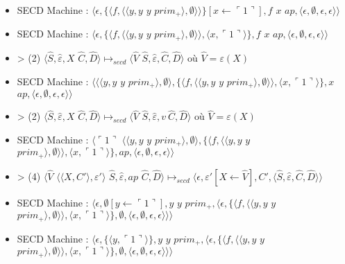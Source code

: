 \documentclass[10pt,a4paper]{article}
\begin{document}
\begin{itemize}
					\item[] SECD Machine : $\langle\epsilon,\{\langle f,\langle\langle y,y$ $y$ $prim_{+}\rangle,\emptyset\rangle\rangle\}[x \leftarrow \ulcorner 1\urcorner],f$ $x$ $ap,\langle\epsilon,\emptyset,\epsilon,\epsilon\rangle\rangle$
					\item[] SECD Machine : $\langle\epsilon,\{\langle f,\langle\langle y,y$ $y$ $prim_{+}\rangle,\emptyset\rangle\rangle,\langle x,\ulcorner 1\urcorner\rangle\},f$ $x$ $ap,\langle\epsilon,\emptyset,\epsilon,\epsilon\rangle\rangle$
					\item[] > (2) $\langle\widehat{S},\widehat{\varepsilon},X$ $\widehat{C},\widehat{D}\rangle \longmapsto_{secd} \langle \widehat{V}$ $\widehat{S},\widehat{\varepsilon},\widehat{C},\widehat{D}\rangle$ où $\widehat{V} = \varepsilon(X)$
					\item[] SECD Machine : $\langle\langle\langle y,y$ $y$ $prim_{+}\rangle,\emptyset\rangle,\{\langle f,\langle\langle y,y$ $y$ $prim_{+}\rangle,\emptyset\rangle\rangle,\langle x,\ulcorner 1\urcorner\rangle\},x$ $ap,\langle\epsilon,\emptyset,\epsilon,\epsilon\rangle\rangle$
					\item[] > (2) $\langle\widehat{S},\widehat{\varepsilon},X$ $\widehat{C},\widehat{D}\rangle \longmapsto_{secd} \langle \widehat{V}$ $\widehat{S},\widehat{\varepsilon},v~
					\widehat{C},\widehat{D}\rangle$ où $\widehat{V} = \varepsilon(X)$
					\item[] SECD Machine : $\langle\ulcorner 1\urcorner$ $\langle\langle y,y$ $y$ $prim_{+}\rangle,\emptyset\rangle,\{\langle f,\langle\langle y,y$ $y$ $prim_{+}\rangle,\emptyset\rangle\rangle,\langle x,\ulcorner 1\urcorner\rangle\},ap,\langle\epsilon,\emptyset,\epsilon,\epsilon\rangle\rangle$
					\item[] > (4) $\langle\widehat{V}$ $\langle\langle X,C'\rangle,\varepsilon'\rangle$ $\widehat{S},\widehat{\varepsilon},ap$ $\widehat{C},\widehat{D}\rangle \longmapsto_{secd} \langle\epsilon,\varepsilon'[X \leftarrow \widehat{V}],C',\langle\widehat{S},\widehat{\varepsilon},\widehat{C},\widehat{D}\rangle\rangle$
					\item[] SECD Machine :	$\langle\epsilon,\emptyset[y \leftarrow \ulcorner 1\urcorner],y$ $y$ $prim_{+},\langle\epsilon,\{\langle f,\langle\langle y,y$ $y$ $prim_{+}\rangle,\emptyset\rangle\rangle,\langle x,\ulcorner 1\urcorner\rangle\} ,\emptyset,\langle\epsilon,\emptyset,\epsilon,\epsilon\rangle\rangle\rangle$
					\item[] SECD Machine : $\langle\epsilon,\{\langle y,\ulcorner 1\urcorner\rangle\},y$ $y$ $prim_{+},\langle\epsilon,\{\langle f,\langle\langle y,y$ $y$ $prim_{+}\rangle,\emptyset\rangle\rangle,\langle x,\ulcorner 1\urcorner\rangle\} ,\emptyset,\langle\epsilon,\emptyset,\epsilon,\epsilon\rangle\rangle\rangle$

\end{itemize}
\end{document}
